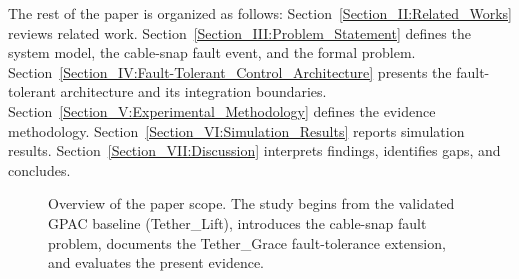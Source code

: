 The rest of the paper is organized as follows: Section~\ref{Section_II:Related_Works} reviews related work. Section~\ref{Section_III:Problem_Statement} defines the system model, the cable-snap fault event, and the formal problem. Section~\ref{Section_IV:Fault-Tolerant_Control_Architecture} presents the fault-tolerant architecture and its integration boundaries. Section~\ref{Section_V:Experimental_Methodology} defines the evidence methodology. Section~\ref{Section_VI:Simulation_Results} reports simulation results. Section~\ref{Section_VII:Discussion} interprets findings, identifies gaps, and concludes.

\begin{figure}[t]
\centering

\caption{Overview of the paper scope. The study begins from the validated GPAC baseline (Tether\_Lift), introduces the cable-snap fault problem, documents the Tether\_Grace fault-tolerance extension, and evaluates the present evidence.}
\label{fig:paper_scope}
\vspace{-5pt}
\end{figure}
